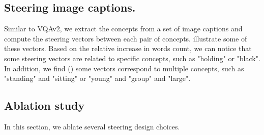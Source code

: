 


\subsection{Steering image captions.}
\label{sec:app_image_captions}

Similar to VQAv2, we extract the concepts from a set of image captions and compute the steering vectors between each pair of concepts.  illustrate some of these vectors. Based on the relative increase in words count, we can notice that some steering vectors are related to specific concepts, such as "holding" or "black". In addition, we find () some vectors correspond to multiple concepts, such as "standing" and "sitting" or "young" and "group" and "large".






\subsection{Ablation study}
\label{sec:app_model_steering_ablation_study}
In this section, we ablate several steering design choices.


